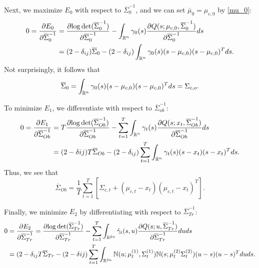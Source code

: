 \documentclass[12pt,leqno]{article}
\begin{document}
Next, we maximize $E_0$ with respect to $\overline{\Sigma}_0^{-1}$, and we can set $\bar{\mu}_0 = \mu_{c,0}$ by \eqref{mu_0}:
\begin{align*}
0 = \frac{\partial{E_0}}{\partial{\overline{\Sigma}_0^{-1}}} &= \frac{\partial{\log\det(\overline{\Sigma}_0^{-1})}}{\partial\overline{\Sigma}_0^{-1}} - \int_{{\mathbb R}^n}\gamma_0(s)\frac{\partial{Q(s;\mu_{c,0},\overline{\Sigma}_0^{-1})}}{\partial{\overline{\Sigma}_0^{-1}}}ds \\
&= (2-\delta_{ij})\overline{\Sigma}_0 - (2-\delta_{ij})\int_{{\mathbb R}^n}\gamma_0(s)(s-\mu_{c,0})(s-\mu_{c,0})^Tds.
\end{align*}
Not surprisingly, it follows that
\begin{equation}\label{Sigma_0}
  \overline{\Sigma}_0 = \int_{{\mathbb R}^n}\gamma_0(s)(s-\mu_{c,0})(s-\mu_{c,0})^Tds = \Sigma_{c,o}.
  \end{equation}

To minimize $E_1$, we differentiate with respect to $\overline{\Sigma}_{ob}^{-1}$:
\begin{align*}
  0 = \frac{\partial{E_1}}{\partial{\overline{\Sigma}_{Ob}^{-1}}} &= T\frac{\partial{\log\det(\overline{\Sigma}_{Ob}^{-1})}}{\partial\overline{\Sigma}_{Ob}^{-1}}
  - \sum_{t=1}^T\int_{{\mathbb R}^n}\gamma_t(s)\frac{\partial{Q(s;x_t,\overline{\Sigma}_{Ob}^{-1})}}{\partial{\overline{\Sigma}_{Ob}^{-1}}}ds \\
  &= (2-\delta{ij})T\overline{\Sigma}_{Ob} - (2-\delta_{ij})\sum_{t=1}^T\int_{{\mathbb R}^n}\gamma_t(s)(s-x_t)(s-x_t)^Tds.
\end{align*}
Thus,  we see that
\begin{equation}\label{Sigma_Ob}
  \overline{\Sigma}_{Ob} = \frac{1}{T}\sum_{t=1}^T [\Sigma_{c,t} + (\mu_{c,t}-x_t)(\mu_{c,t}-x_t)^T].
\end{equation}

Finally, we minimize $E_2$ by differentiating with respect to $\overline{\Sigma}_{Tr}^{-1}$:
\begin{equation}\label{Sigma_Tr:0}
  \begin{split}
  0 &= \frac{\partial{E_2}}{\partial{\overline{\Sigma}_{Tr}^{-1}}} = \frac{\partial{\log\det(\overline{\Sigma}_{Tr}^{-1})}}{\partial\overline{\Sigma}_{Tr}^{-1}}
  - \sum_{t=1}^T\int_{{\mathbb R}^{2n}}\hat{\gamma}_t(s,u)\frac{\partial{Q(s;u,\overline{\Sigma}_{Tr}^{-1})}}{\partial\overline{\Sigma}_{Tr}^{-1}}duds \\
      &= (2-\delta_{ij}T\overline{\Sigma}_{Tr} - (2-\delta{ij}) \sum_{t=1}^T\int_{{\mathbb R}^{2n}}{\mathbb N}(u;\mu^{(1)}_t,\Sigma^{(1)}_t){\mathbb N}(s;\mu^{(2)}_t\Sigma^{(2)}_t)(u-s)(u-s)^Tduds.
  \end{split}
\end{equation}
\end{document}
